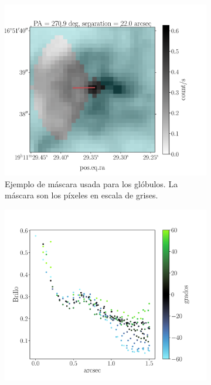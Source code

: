 \documentclass{book}
\begin{document}
\begin{figure}[htb]
  \begin{subfigure}[b]{0.5\textwidth}
    \includegraphics[width=\textwidth, height=0.9\textwidth]{Nuevas imagenes finales/F_4_1_A.pdf}
    \caption{Ejemplo de máscara usada para los glóbulos. La máscara son los píxeles en escala de grises.}
    \label{fig:f1}
  \end{subfigure}
  \hfill
  \begin{subfigure}[b]{0.5\textwidth}
    \includegraphics[width=\textwidth, height=0.9\textwidth]{Nuevas imagenes finales/F_4_1_B.pdf}

\end{subfigure}
\end{figure}
\end{document}
